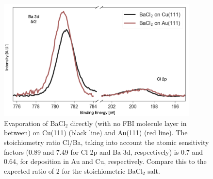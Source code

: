 \documentclass[aps,prl,reprint,longbibliography,superscriptaddress, english]{revtex4-1}
\def\BappCl{BaCl$_2$ }
\begin{document}
\begin{figure}[ht!]
	\includegraphics[width=0.9\textwidth]{figures/si_bacl_au_cu.png}
	\caption{\label{Chlorine_desorption} 
    Evaporation of \BappCl directly (with no FBI molecule layer in between) on Cu(111) (black line) and Au(111) (red line). The stoichiometry ratio Cl/Ba, taking into account the atomic sensitivity factors (0.89 and 7.49 for Cl 2p and Ba 3d, respectively) is 0.7 and 0.64, for deposition in Au and Cu, respectively. Compare this to the expected ratio of 2 for the stoichiometric \BappCl salt.}
\end{figure}  
\end{document}
